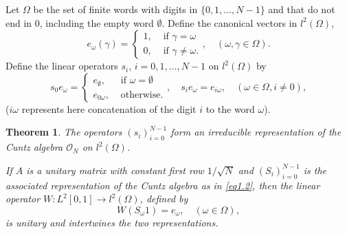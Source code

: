 \documentclass[11pt]{amsart}
\newtheorem{theorem}{Theorem}[section]
\theoremstyle{definition}
\theoremstyle{remark}
\numberwithin{equation}{section}
\def\ty{\emptyset}
\begin{document}
Let $\Omega$ be the set of finite words with digits in $\{0,1,\dots,N-1\}$ and that do not end in 0, including the empty word $\ty$. Define the canonical vectors in $l^2(\Omega)$, 
$$e_\omega(\gamma)=\left\{\begin{array}{cc}
1,&\mbox{ if }\gamma=\omega\\
0,&\mbox{ if }\gamma\neq\omega.\end{array}\right., \quad(\omega,\gamma\in\Omega).$$
Define the linear operators $s_i$, $i=0,1,\dots,N-1$ on $l^2(\Omega)$ by
\begin{equation}
s_0e_\omega=\left\{\begin{array}{cc}
e_\ty,&\mbox{ if }\omega=\ty\\
e_{0\omega},&\mbox{ otherwise.}\end{array}\right.,\quad s_ie_\omega=e_{i\omega}, \quad(\omega\in \Omega,i\neq 0),
\label{eq3.1}
\end{equation}
($i\omega$ represents here concatenation of the digit $i$ to the word $\omega$). 

\begin{theorem}\label{th3.1}
The operators $(s_i)_{i=0}^{N-1}$ form an irreducible representation of the Cuntz algebra $\mathcal O_N$ on $l^2(\Omega)$.

If $A$ is a unitary matrix with constant first row $1/\sqrt{N}$ and $(S_i)_{i=0}^{N-1}$ is the associated representation of the Cuntz algebra as in \eqref{eq1.2}, then the linear operator $W:L^2[0,1]\rightarrow l^2(\Omega)$, defined by
\begin{equation}
W(S_\omega1)=e_\omega,\quad(\omega\in\Omega),
\label{eq3.1.1}
\end{equation}
is unitary and intertwines the two representations.
\end{theorem}
\end{document}
